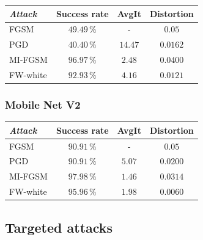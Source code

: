 \documentclass[10pt,twocolumn,letterpaper, english]{article}
\theoremstyle{definition}
\theoremstyle{plain}
\theoremstyle{plain}
\theoremstyle{plain}
\theoremstyle{plain}
\theoremstyle{remark}
\theoremstyle{remark}
\theoremstyle{definition}
\theoremstyle{definition}
\theoremstyle{definition}
\theoremstyle{definition}
\begin{document}
\begin{center}
    

\begin{tabular}{ |l|c|c|c| }
 \hline
  \textit{Attack} & Success rate & AvgIt & Distortion \\
 \hline
 
 FGSM   & $49.49\,\%$   &  - & $0.05$\\
 PGD&   $40.40\,\%$  & $14.47$  & $0.0162$ \\
 MI-FGSM & $96.97\,\%$ & $2.48$ & $0.0400$\\
 FW-white & $92.93\,\%$ & $4.16$ & $0.0121$\\
\hline
\end{tabular}
\end{center}

\subsubsection{Mobile Net V2}

\begin{center}
    
\begin{tabular}{ |l|c|c|c| }
 \hline
  \textit{Attack} & Success rate & AvgIt & Distortion \\
 \hline
 
 FGSM   & $90.91\,\%$   &  - & $0.05$\\
 PGD&   $90.91\,\%$  & $5.07$  & $0.0200$ \\
 MI-FGSM & $97.98\,\%$ & $1.46$ & $0.0314$\\
 FW-white & $95.96\,\%$ & $1.98$ & $0.0060$\\
\hline
\end{tabular}
\end{center}

\subsection{Targeted attacks}


 
\end{document}
